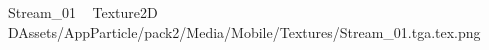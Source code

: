 	   Stream_01             	   Texture2D	   D   Assets/AppParticle/pack2/Media/Mobile/Textures/Stream_01.tga.tex.png